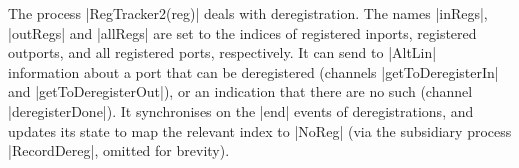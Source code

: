 




The process |RegTracker2(reg)| deals with deregistration.  The names |inRegs|,
|outRegs| and |allRegs| are set to the indices of registered inports,
registered outports, and all registered ports, respectively.  It can send to
|AltLin| information about a port that can be deregistered (channels
|getToDeregisterIn| and |getToDeregisterOut|), or an indication that there are
no such (channel |deregisterDone|).  It synchronises on the |end| events of
deregistrations, and updates its state to map the relevant index to |NoReg|
(via the subsidiary process |RecordDereg|, omitted for brevity).

